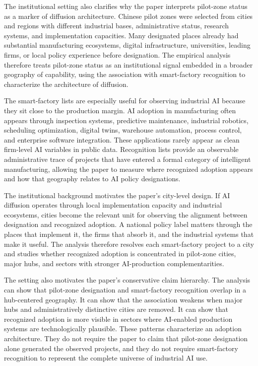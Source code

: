 \documentclass[12pt]{article}
\begin{document}
The institutional setting also clarifies why the paper interprets pilot-zone status as a marker of diffusion architecture. Chinese pilot zones were selected from cities and regions with different industrial bases, administrative status, research systems, and implementation capacities. Many designated places already had substantial manufacturing ecosystems, digital infrastructure, universities, leading firms, or local policy experience before designation. The empirical analysis therefore treats pilot-zone status as an institutional signal embedded in a broader geography of capability, using the association with smart-factory recognition to characterize the architecture of diffusion.

The smart-factory lists are especially useful for observing industrial AI because they sit close to the production margin. AI adoption in manufacturing often appears through inspection systems, predictive maintenance, industrial robotics, scheduling optimization, digital twins, warehouse automation, process control, and enterprise software integration. These applications rarely appear as clean firm-level AI variables in public data. Recognition lists provide an observable administrative trace of projects that have entered a formal category of intelligent manufacturing, allowing the paper to measure where recognized adoption appears and how that geography relates to AI policy designations.

The institutional background motivates the paper's city-level design. If AI diffusion operates through local implementation capacity and industrial ecosystems, cities become the relevant unit for observing the alignment between designation and recognized adoption. A national policy label matters through the places that implement it, the firms that absorb it, and the industrial systems that make it useful. The analysis therefore resolves each smart-factory project to a city and studies whether recognized adoption is concentrated in pilot-zone cities, major hubs, and sectors with stronger AI-production complementarities.

The setting also motivates the paper's conservative claim hierarchy. The analysis can show that pilot-zone designation and smart-factory recognition overlap in a hub-centered geography. It can show that the association weakens when major hubs and administratively distinctive cities are removed. It can show that recognized adoption is more visible in sectors where AI-enabled production systems are technologically plausible. These patterns characterize an adoption architecture. They do not require the paper to claim that pilot-zone designation alone generated the observed projects, and they do not require smart-factory recognition to represent the complete universe of industrial AI use.
\end{document}
